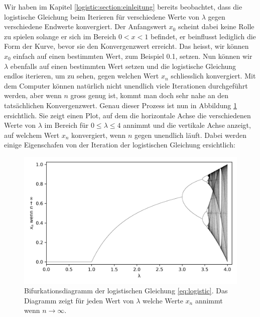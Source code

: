 Wir haben im Kapitel 
\ref{logistic:section:einleitung} 
bereits beobachtet,
dass die logistische Gleichung beim Iterieren für 
verschiedene Werte von $\lambda$ gegen verschiedene 
Endwerte konvergiert. 
Der Anfangswert $x_0$ scheint dabei keine Rolle zu spielen
solange er sich im Bereich $0 < x < 1$ befindet, 
er beinflusst lediglich die Form der Kurve, 
bevor sie den Konvergenzwert erreicht. 
Das heisst, wir können $x_0$ einfach auf einen bestimmten Wert, 
zum Beispiel 0.1, setzen. 
Nun können wir $\lambda$ ebenfalls auf einen bestimmten Wert setzen
und die logistische Gleichung endlos iterieren, 
um zu sehen, gegen welchen Wert $x_n$ schliesslich konvergiert.
Mit dem Computer können natürlich nicht unendlich viele Iterationen
durchgeführt werden, aber wenn $n$ gross genug ist, 
kommt man doch sehr nahe an den tatsächlichen Konvergenzwert. 
Genau dieser Prozess ist nun in Abbildung \ref{fig:map_1} 
ersichtlich. 
Sie zeigt einen Plot, 
auf dem die horizontale Achse die verschiedenen Werte
von $\lambda$ im Bereich für $0 \leq \lambda \leq 4$ annimmt 
und die vertikale Achse anzeigt,
auf welchem Wert $x_n$ konvergiert, wenn $n$ gegen
unendlich läuft. Dabei werden einige Eigenschafen 
von der Iteration der logistischen Gleichung ersichtlich:
\begin{figure}
    \includegraphics[width=\linewidth]{papers/logistic/figures/map.png}
    \caption{
        Bifurkationsdiagramm der logistischen Gleichung \eqref{eq:logistic}.
        Das Diagramm zeigt für jeden Wert von $\lambda$
        welche Werte $x_n$ annimmt wenn $n \rightarrow \infty$.
    }
    \label{fig:map_1}
\end{figure}
